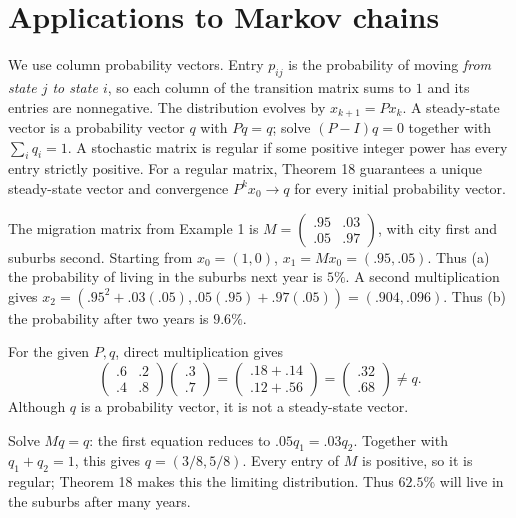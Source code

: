 \section{Applications to Markov chains}
We use column probability vectors. Entry $p_{ij}$ is the probability of
moving \emph{from state $j$ to state $i$}, so each column of the transition
matrix sums to $1$ and its entries are nonnegative. The distribution evolves
by $x_{k+1}=Px_k$. A steady-state vector is a probability vector $q$ with
$Pq=q$; solve $(P-I)q=0$ together with $\sum_iq_i=1$.
A stochastic matrix is regular if some positive integer power has every entry
strictly positive. For a regular matrix, Theorem 18 guarantees a unique
steady-state vector and convergence $P^kx_0\to q$ for every initial probability vector.

The migration matrix from Example 1 is
$M=\left(\begin{smallmatrix}.95&.03\\.05&.97\end{smallmatrix}\right)$,
with city first and suburbs second. Starting from $x_0=(1,0)$,
$x_1=Mx_0=(.95,.05)$. Thus (a) the probability of living in the suburbs
next year is $5\%$. A second multiplication gives
$x_2=(.95^2+.03(.05),.05(.95)+.97(.05))=(.904,.096)$.
Thus (b) the probability after two years is $9.6\%$.

For the given $P,q$, direct multiplication gives
\[
 \begin{pmatrix}.6&.2\\.4&.8\end{pmatrix}
 \begin{pmatrix}.3\\.7\end{pmatrix}
 =\begin{pmatrix}.18+.14\\.12+.56\end{pmatrix}
 =\begin{pmatrix}.32\\.68\end{pmatrix}\ne q.
\]
Although $q$ is a probability vector, it is not a steady-state vector.

Solve $Mq=q$: the first equation reduces to $.05q_1=.03q_2$.
Together with $q_1+q_2=1$, this gives $q=(3/8,5/8)$.
Every entry of $M$ is positive, so it is regular; Theorem 18 makes this
the limiting distribution. Thus $62.5\%$ will live in the suburbs after many years.


